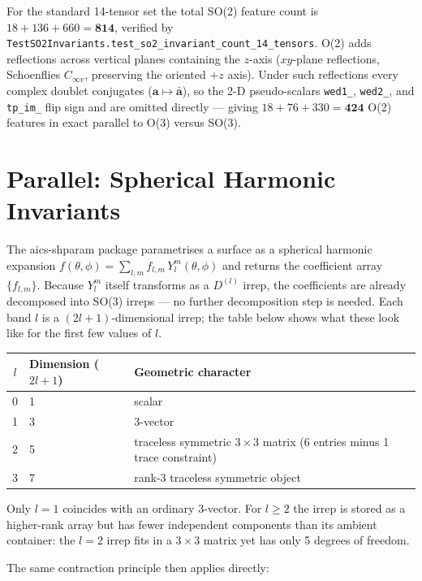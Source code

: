 \documentclass[11pt,a4paper]{article}
\begin{document}
For the standard 14-tensor set the total SO(2) feature count is $18 + 136 + 660 = \mathbf{814}$,
verified by \texttt{TestSO2Invariants.test\_so2\_invariant\_count\_14\_tensors}.
O(2) adds reflections across vertical planes containing the $z$-axis
($xy$-plane reflections, Schoenflies $C_{\infty v}$, preserving the oriented $+z$ axis).
Under such reflections every complex doublet conjugates ($\mathbf{a} \mapsto \bar{\mathbf{a}}$),
so the 2-D pseudo-scalars \texttt{wed1\_}, \texttt{wed2\_}, and \texttt{tp\_im\_} flip sign
and are omitted directly — giving $18 + 76 + 330 = \mathbf{424}$ O(2) features in exact
parallel to O(3) versus SO(3).

\section{Parallel: Spherical Harmonic Invariants}
\label{sec:spharm}

The aics-shparam package parametrises a surface as a spherical harmonic expansion
$f(\theta,\phi) = \sum_{l,m} f_{l,m}\, Y_l^m(\theta,\phi)$ and returns the
coefficient array $\{f_{l,m}\}$.
Because $Y_l^m$ itself transforms as a $D^{(l)}$ irrep, the coefficients are
already decomposed into SO(3) irreps — no further decomposition step is needed.
Each band $l$ is a $(2l+1)$-dimensional irrep; the table below shows what these
look like for the first few values of $l$.

\begin{center}
\begin{tabular}{cll}
\toprule
$l$ & Dimension ($2l+1$) & Geometric character \\
\midrule
0 & 1 & scalar \\
1 & 3 & 3-vector \\
2 & 5 & traceless symmetric $3\times3$ matrix (6 entries minus 1 trace constraint) \\
3 & 7 & rank-3 traceless symmetric object \\
\bottomrule
\end{tabular}
\end{center}

\noindent
Only $l=1$ coincides with an ordinary 3-vector.
For $l \ge 2$ the irrep is stored as a higher-rank array but has fewer independent
components than its ambient container: the $l=2$ irrep fits in a $3\times3$ matrix
yet has only 5 degrees of freedom.

The same contraction principle then applies directly:
\end{document}
